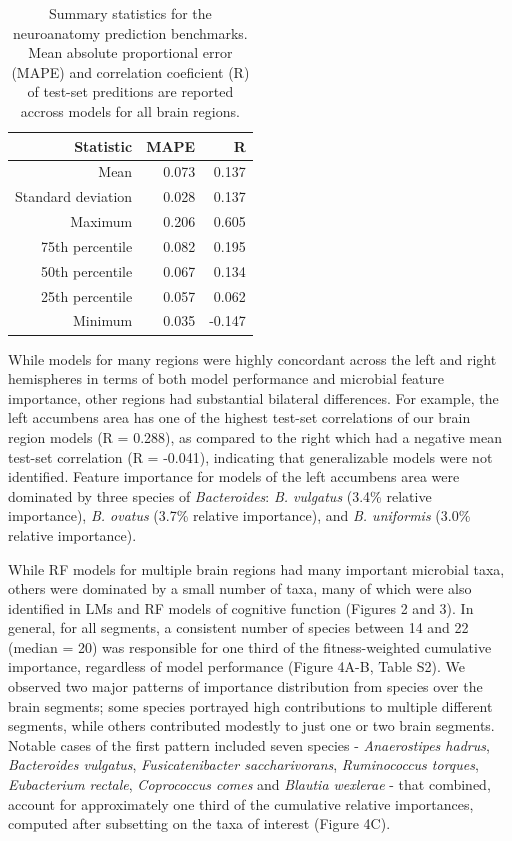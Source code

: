 \documentclass{article}
\begin{document}
\begin{table}[!h]
    \begin{center}
    \begin{tabular}{|r|r|r|}
      \hline\hline
      \textbf{Statistic} & \textbf{MAPE} & \textbf{R} \\\hline
      Mean & 0.073 & 0.137 \\
      Standard deviation & 0.028 & 0.137 \\
      Maximum & 0.206 & 0.605 \\
      75th percentile & 0.082 & 0.195 \\
      50th percentile & 0.067 & 0.134 \\
      25th percentile & 0.057 & 0.062 \\
      Minimum & 0.035 & -0.147 \\\hline\hline
    \end{tabular}
    \caption{\label{tab:neuro}Summary statistics for the neuroanatomy prediction benchmarks.
    Mean absolute proportional error (MAPE) and correlation coeficient (R)
    of test-set preditions are reported accross models for all brain regions.}
    \end{center}
\end{table}

While models for many regions were highly concordant across the
left and right hemispheres in terms of both model performance and
microbial feature importance, other regions had substantial
bilateral differences. For example, the left accumbens area
has one of the highest test-set correlations of our
brain region models (R = 0.288), as compared to the right which
had a negative mean test-set correlation (R = -0.041),
indicating that generalizable models were not identified.
Feature importance for models of the left accumbens area were dominated
by three species of \emph{Bacteroides}: \emph{B. vulgatus} (3.4\%
relative importance), \emph{B. ovatus} (3.7\% relative importance), and
\emph{B. uniformis} (3.0\% relative importance).

While RF models for multiple brain regions had many important microbial taxa,
others were dominated by a small number of taxa, many of which
were also identified in LMs and RF models of cognitive function (Figures 2 and 3). 
In general, for all segments, a
consistent number of species between 14 and 22 (median = 20) was
responsible for one third of the fitness-weighted cumulative importance,
regardless of model performance (Figure 4A-B, Table S2).
We observed two major patterns of importance distribution from
species over the brain segments; some species portrayed high contributions
to multiple different segments, while others contributed modestly to
just one or two brain segments. Notable cases of the first pattern
included seven species - \emph{Anaerostipes hadrus}, \emph{Bacteroides
vulgatus}, \emph{Fusicatenibacter saccharivorans}, \emph{Ruminococcus
torques}, \emph{Eubacterium rectale}, \emph{Coprococcus comes} and
\emph{Blautia wexlerae} - that combined, account for approximately one
third of the cumulative relative importances, computed after subsetting
on the taxa of interest (Figure 4C).
\end{document}
